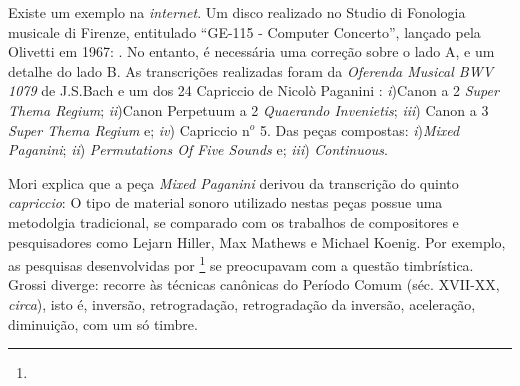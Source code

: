 Existe um exemplo na \emph{internet}. Um disco realizado no Studio di Fonologia musicale di Firenze, entitulado ``GE-115 - Computer Concerto'', lançado pela Olivetti em 1967: . No entanto, é necessária uma correção sobre o lado A, e um detalhe do lado B. As transcrições realizadas foram da \emph{Oferenda Musical BWV 1079} de J.S.Bach e um dos 24 Capriccio de Nicolò Paganini : \emph{i})Canon a 2 \emph{Super Thema Regium}; \emph{ii})Canon Perpetuum a 2 \emph{Quaerando Invenietis}; \emph{iii}) Canon a 3 \emph{Super Thema Regium} e; \emph{iv}) Capriccio n$^o$ 5. Das peças compostas:  \emph{i})\emph{Mixed Paganini}; \emph{ii}) \emph{Permutations Of Five Sounds} e; \emph{iii}) \emph{Continuous}.


Mori explica que a peça \emph{Mixed Paganini} derivou da transcrição do quinto \emph{capriccio}:  O tipo de material sonoro utilizado nestas peças possue uma metodolgia tradicional, se comparado com os trabalhos de compositores e pesquisadores como Lejarn Hiller, Max Mathews e Michael Koenig. Por exemplo, as pesquisas desenvolvidas por \cite{mathews_digital_1963}\footnote{} se preocupavam com a questão timbrística. Grossi diverge: recorre às técnicas canônicas do Período Comum (séc. XVII-XX, \emph{circa}), isto é, inversão, retrogradação, retrogradação da inversão, aceleração, diminuição, com um só timbre. 

